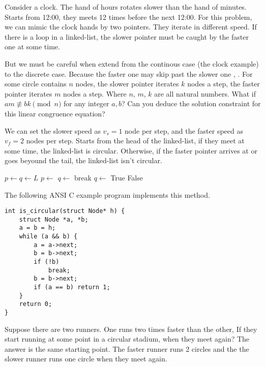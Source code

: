 \documentclass{article}
\begin{document}
Consider a clock. The hand of hours rotates slower than the hand of minutes. Starts
from 12:00, they meets 12 times before the next 12:00. For this problem,
we can mimic the clock hands by two pointers. They iterate in different speed.
If there is a loop in a linked-list, the slower pointer must be caught by the faster
one at some time.

But we must be careful when extend from the continous case (the clock example) to
the discrete case. Because the faster one may skip past the slower one \cite{Stepanov09}, \cite{TAOCP2}.
For some circle contains $n$ nodes, the
slower pointer iterates $k$ nodes a step, the faster pointer iterates $m$ nodes a step.
Where $n$, $m$, $k$ are all natural numbers. What if $am \not\equiv bk \pmod n$ for
any integer $a, b$? Can you deduce the solution constraint for this linear congruence equation?

We can set the slower speed as $v_s = 1$ node per step,
and the faster speed as $v_f = 2$ nodes per step. Starts from the head of the linked-list, if they
meet at some time, the linked-list is circular. Otherwise, if the faster pointer
arrives at or goes beyound the tail, the linked-list isn't circular.

\begin{algorithmic}[1]
  \State $p \gets q \gets L$
    \State $p \gets$ 
    \State $q \gets$ 
      \State break
    \EndIf
    \State $q \gets$ 
      \State \Return True
    \EndIf
  \EndWhile
  \State \Return False
\EndFunction
\end{algorithmic}

The following ANSI C example program implements this method.

\lstset{language=C}
\begin{lstlisting}
int is_circular(struct Node* h) {
    struct Node *a, *b;
    a = b = h;
    while (a && b) {
        a = a->next;
        b = b->next;
        if (!b)
            break;
        b = b->next;
        if (a == b) return 1;
    }
    return 0;
}
\end{lstlisting}

Suppose there are two runners. One runs two times faster than the other, If they start
running at some point in a circular stadium, when they meet again? The answer is the
same starting point. The faster runner runs 2 circles and the the slower runner runs
one circle when they meet again.
\end{document}

